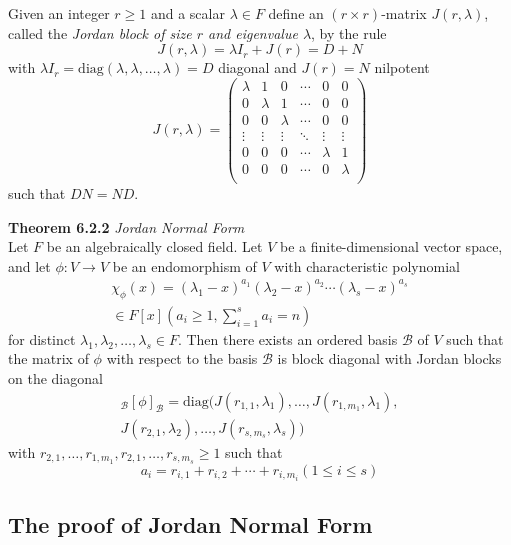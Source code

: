 \documentclass[8pt,landscape]{article}
\begin{document}
\begin{multicols}{3}
    Given an integer $r \geq 1$ and a scalar $\lambda \in F$ define an
    $(r \times r)$-matrix $J(r, \lambda)$, called the
    \emph{Jordan block of size $r$ and eigenvalue $\lambda$}, by the rule
    \[
        J(r, \lambda) = \lambda I_r + J(r) = D + N
    \]
    with $\lambda I_r = \mathrm{diag}(\lambda, \lambda, \ldots, \lambda) = D$
    diagonal and $J(r) = N$ nilpotent
    \[
        J(r, \lambda) =
        \begin{pmatrix}
            \lambda & 1 & 0 & \cdots & 0 & 0 \\
            0 & \lambda & 1 & \cdots & 0 & 0 \\
            0 & 0 & \lambda & \cdots & 0 & 0 \\
            \vdots & \vdots & \vdots & \ddots & \vdots & \vdots \\
            0 & 0 & 0 & \cdots & \lambda & 1 \\
            0 & 0 & 0 & \cdots & 0 & \lambda \\
        \end{pmatrix}
    \]
    such that $DN = ND$.

    \textbf{Theorem 6.2.2} \emph{Jordan Normal Form} \\
    Let $F$ be an algebraically closed field.
    Let $V$ be a finite-dimensional vector space,
    and let $\phi : V \to V$ be an endomorphism of $V$ with characteristic polynomial
    \begin{align*}{}
        \chi_\phi (x) = {(\lambda_1 - x)}^{a_1} {(\lambda_2 - x)}^{a_2} \cdots
        {(\lambda_s - x)}^{a_s} \\
        \in F[x] (a_i \geq 1, \sum_{i=1}^s a_i = n)
    \end{align*}
    for distinct $\lambda_1, \lambda_2, \ldots, \lambda_s \in F$.
    Then there exists an ordered basis $\mathcal{B}$ of $V$ such that the matrix of
    $\phi$ with respect to the basis $\mathcal{B}$ is block diagonal with Jordan
    blocks on the diagonal
    \begin{align*}{}
        _\mathcal{B} {[\phi]}_\mathcal{B} =
        \mathrm{diag}(J(r_{1,1}, \lambda_1), \ldots,
        J(r_{1,m_1}, \lambda_1), \\
        J(r_{2,1}, \lambda_2), \ldots, J(r_{s,m_s}, \lambda_s))
    \end{align*}
    with $r_{2,1}, \ldots, r_{1,m_1}, r_{2,1}, \ldots, r_{s, m_s} \geq 1$ such that
    \[
        a_i = r_{i,1} + r_{i,2} + \cdots + r_{i, m_i} (1 \leq i \leq s)
    \]
    \subsection{The proof of Jordan Normal Form}


\end{multicols}
\end{document}
